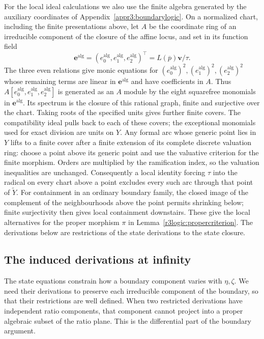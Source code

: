 \documentclass[11pt,a4paper]{article}
\numberwithin{equation}{section}
\theoremstyle{plain}
\theoremstyle{definition}
\theoremstyle{remark}
\begin{document}
For the local ideal calculations we also use the finite algebra generated by the auxiliary coordinates
of Appendix~\ref{appr3:boundarylogic}.
On a normalized chart, including the finite presentations above,
let $A$ be the coordinate ring of an irreducible component of the
closure of the affine locus, and set
in its function field
\[
 \boldsymbol e^{\mathrm{alg}}=(e_0^{\mathrm{alg}},e_1^{\mathrm{alg}},e_2^{\mathrm{alg}})^{\top}
                         =L(\overline p)\boldsymbol v/\tau.
\]
The three even relations give monic equations for
$(e_0^{\mathrm{alg}})^2,(e_1^{\mathrm{alg}})^2,(e_2^{\mathrm{alg}})^2$
whose remaining terms are linear in $\boldsymbol e^{\mathrm{alg}}$ and have coefficients in $A$.
Thus $A[e_0^{\mathrm{alg}},e_1^{\mathrm{alg}},e_2^{\mathrm{alg}}]$ is generated as an $A$ module by the eight
squarefree monomials in $\boldsymbol e^{\mathrm{alg}}$. Its spectrum is the closure of this
rational graph, finite and surjective over the chart.
Taking roots of the specified units gives further finite covers.
The compatibility ideal pulls back to each of these covers;
the exceptional monomials used for exact division are units on $Y$.
Any formal arc whose generic point lies in $Y$ lifts to a finite cover
after a finite extension of its complete discrete valuation ring:
choose a point above its generic point and use the valuative criterion
for the finite morphism. Orders are multiplied by the ramification
index, so the valuation inequalities are unchanged.
Consequently a local identity forcing $\tau$ into the radical on
every chart above a point excludes every such arc through that point
of $\widetilde Y$. For containment in an ordinary boundary family,
the closed image of the complement of the neighbourhoods above the
point permits shrinking below; finite surjectivity then gives local
containment downstairs.
These give the local alternatives for the proper morphism $\pi$
in Lemma~\ref{r3logic:propercriterion}.
The derivations below are restrictions of the state derivations to
the state closure.

\subsection{The induced derivations at infinity}

The state equations constrain how a boundary component varies with
$\eta ,\zeta $. We need their derivations to preserve each irreducible
component of the boundary, so that their restrictions are well defined.
When two restricted derivations have independent ratio components,
that component cannot project into a proper algebraic subset of the
ratio plane. This is the differential part of the boundary argument.
\end{document}
